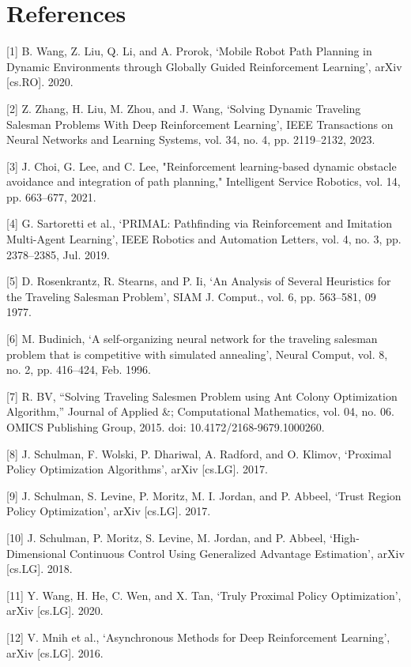 \documentclass{article}
\begin{document}
	\section*{References}
	
	[1] B. Wang, Z. Liu, Q. Li, and A. Prorok, ‘Mobile Robot Path Planning in Dynamic Environments through Globally Guided Reinforcement Learning’, arXiv [cs.RO]. 2020.
	
	[2] Z. Zhang, H. Liu, M. Zhou, and J. Wang, ‘Solving Dynamic Traveling Salesman Problems With Deep Reinforcement Learning’, IEEE Transactions on Neural Networks and Learning Systems, vol. 34, no. 4, pp. 2119–2132, 2023.
	
	[3] J. Choi, G. Lee, and C. Lee, "Reinforcement learning-based dynamic obstacle avoidance and integration of path planning," Intelligent Service Robotics, vol. 14, pp. 663–677, 2021. 
		
	[4] G. Sartoretti et al., ‘PRIMAL: Pathfinding via Reinforcement and Imitation Multi-Agent Learning’, IEEE Robotics and Automation Letters, vol. 4, no. 3, pp. 2378–2385, Jul. 2019.
	
	[5] D. Rosenkrantz, R. Stearns, and P. Ii, ‘An Analysis of Several Heuristics for the Traveling Salesman Problem’, SIAM J. Comput., vol. 6, pp. 563–581, 09 1977.
	
	[6] M. Budinich, ‘A self-organizing neural network for the traveling salesman problem that is competitive with simulated annealing’, Neural Comput, vol. 8, no. 2, pp. 416–424, Feb. 1996.
	
	[7] R. BV, “Solving Traveling Salesmen Problem using Ant Colony Optimization Algorithm,” Journal of Applied \&; Computational Mathematics, vol. 04, no. 06. OMICS Publishing Group, 2015. doi: 10.4172/2168-9679.1000260.
	
	[8] J. Schulman, F. Wolski, P. Dhariwal, A. Radford, and O. Klimov, ‘Proximal Policy Optimization Algorithms’, arXiv [cs.LG]. 2017.
	
	[9] J. Schulman, S. Levine, P. Moritz, M. I. Jordan, and P. Abbeel, ‘Trust Region Policy Optimization’, arXiv [cs.LG]. 2017.
	
	[10] J. Schulman, P. Moritz, S. Levine, M. Jordan, and P. Abbeel, ‘High-Dimensional Continuous Control Using Generalized Advantage Estimation’, arXiv [cs.LG]. 2018.
	
	[11] Y. Wang, H. He, C. Wen, and X. Tan, ‘Truly Proximal Policy Optimization’, arXiv [cs.LG]. 2020.
	
	[12] V. Mnih et al., ‘Asynchronous Methods for Deep Reinforcement Learning’, arXiv [cs.LG]. 2016.
	
\end{document}
